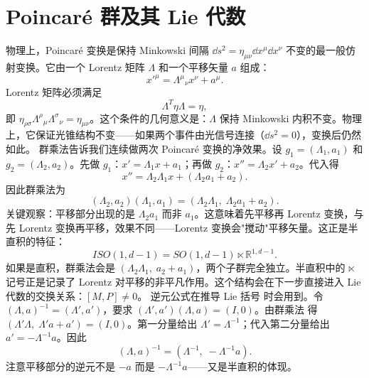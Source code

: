 \section{Poincaré 群及其 Lie 代数}
物理上，Poincaré 变换是保持 Minkowski 间隔 $\dd s^2=\eta_{\mu\nu}\dd x^\mu \dd x^\nu$ 不变的最一般仿射变换。它由一个 Lorentz 矩阵 $\Lambda$ 和一个平移矢量 $a$ 组成：
\begin{equation*}x'^\mu=\Lambda^\mu{}_\nu x^\nu+a^\mu.
\end{equation*}
Lorentz 矩阵必须满足
\begin{equation}\label{eq:ms-poincare-lorentz-def}
\boxed{\Lambda^T\eta\Lambda=\eta,}
\end{equation}
即 $\eta_{\rho\sigma}\Lambda^\rho{}_\mu\Lambda^\sigma{}_\nu=\eta_{\mu\nu}$。这个条件的几何意义是：$\Lambda$ 保持 Minkowski 内积不变。物理上，它保证光锥结构不变——如果两个事件由光信号连接（$\dd s^2=0$），变换后仍然如此。
群乘法告诉我们连续做两次 Poincaré 变换的净效果。设 $g_1=(\Lambda_1,a_1)$ 和 $g_2=(\Lambda_2,a_2)$。先做 $g_1$：$x'=\Lambda_1 x+a_1$；再做 $g_2$：$x''=\Lambda_2 x'+a_2$。代入得
\begin{equation}
x''=\Lambda_2\Lambda_1 x+(\Lambda_2 a_1+a_2).
\end{equation}
因此群乘法为
\begin{equation}\label{eq:ms-poincare-semidirect}
\boxed{
(\Lambda_2,a_2)(\Lambda_1,a_1)=(\Lambda_2\Lambda_1,\;\Lambda_2 a_1+a_2).
}
\end{equation}
关键观察：平移部分出现的是 $\Lambda_2 a_1$ 而非 $a_1$。这意味着先平移再 Lorentz 变换，与先 Lorentz 变换再平移，效果不同——Lorentz 变换会"搅动"平移矢量。这正是半直积的特征：
\begin{equation}
ISO(1,d-1)=SO(1,d-1)\ltimes\mathbb{R}^{1,d-1}.
\end{equation}
如果是直积，群乘法会是 $(\Lambda_2\Lambda_1,\;a_2+a_1)$，两个子群完全独立。半直积中的 $\ltimes$ 记号正是记录了 Lorentz 对平移的非平凡作用。这个结构会在下一步直接进入 Lie 代数的交换关系：$[M,P]\neq 0$。
逆元公式在推导 Lie 括号 时会用到。令 $(\Lambda,a)^{-1}=(\Lambda',a')$，要求 $(\Lambda',a')(\Lambda,a)=(I,0)$。由群乘法 得 $(\Lambda'\Lambda,\;\Lambda'a+a')=(I,0)$。第一分量给出 $\Lambda'=\Lambda^{-1}$；代入第二分量给出 $a'=-\Lambda^{-1}a$。因此
\begin{equation}\label{eq:ms-poincare-inverse}
(\Lambda,a)^{-1}=(\Lambda^{-1},\;-\Lambda^{-1}a).
\end{equation}
注意平移部分的逆元不是 $-a$ 而是 $-\Lambda^{-1}a$——又是半直积的体现。


